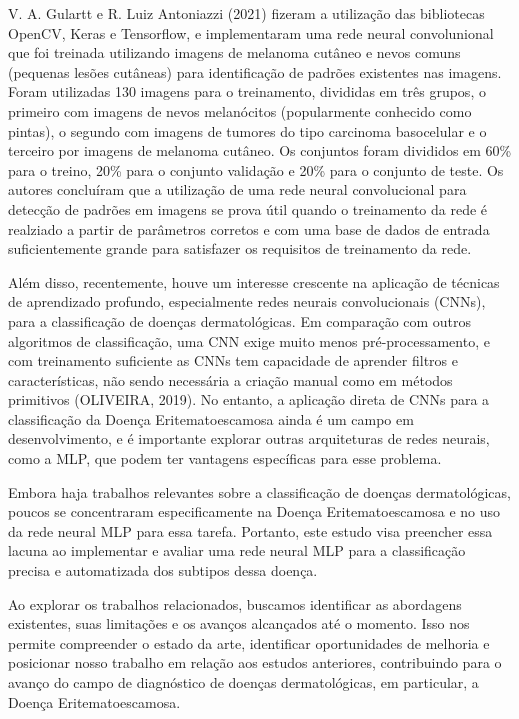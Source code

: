 \documentclass[conference]{IEEEtran}
\begin{document}
V. A. Gulartt e R. Luiz Antoniazzi (2021) fizeram a utilização das bibliotecas OpenCV, Keras e Tensorflow, e implementaram uma rede neural convolunional que foi treinada utilizando imagens de melanoma cutâneo e nevos comuns (pequenas lesões cutâneas) para identificação de padrões existentes nas imagens. Foram utilizadas 130 imagens para o treinamento, divididas em três grupos, o primeiro com imagens de nevos melanócitos (popularmente conhecido como pintas), o segundo com imagens de tumores do tipo carcinoma basocelular e o terceiro por imagens de melanoma cutâneo. Os conjuntos foram divididos em 60\% para o treino, 20\% para o conjunto validação e 20\% para o conjunto de teste. Os autores concluíram que a utilização de uma rede neural convolucional para detecção de padrões em imagens se prova útil quando o treinamento da rede é realziado a partir de parâmetros corretos e com uma base de dados de entrada suficientemente grande para satisfazer os requisitos de treinamento da rede.

Além disso, recentemente, houve um interesse crescente na aplicação de técnicas de aprendizado profundo, especialmente redes neurais convolucionais (CNNs), para a classificação de doenças dermatológicas. Em comparação com outros algoritmos de classificação, uma CNN exige muito menos pré-processamento, e com treinamento suficiente as CNNs tem capacidade de aprender filtros e características, não sendo necessária a criação manual como em métodos primitivos (OLIVEIRA, 2019). No entanto, a aplicação direta de CNNs para a classificação da Doença Eritematoescamosa ainda é um campo em desenvolvimento, e é importante explorar outras arquiteturas de redes neurais, como a MLP, que podem ter vantagens específicas para esse problema.

Embora haja trabalhos relevantes sobre a classificação de doenças dermatológicas, poucos se concentraram especificamente na Doença Eritematoescamosa e no uso da rede neural MLP para essa tarefa. Portanto, este estudo visa preencher essa lacuna ao implementar e avaliar uma rede neural MLP para a classificação precisa e automatizada dos subtipos dessa doença.

Ao explorar os trabalhos relacionados, buscamos identificar as abordagens existentes, suas limitações e os avanços alcançados até o momento. Isso nos permite compreender o estado da arte, identificar oportunidades de melhoria e posicionar nosso trabalho em relação aos estudos anteriores, contribuindo para o avanço do campo de diagnóstico de doenças dermatológicas, em particular, a Doença Eritematoescamosa.
\end{document}
